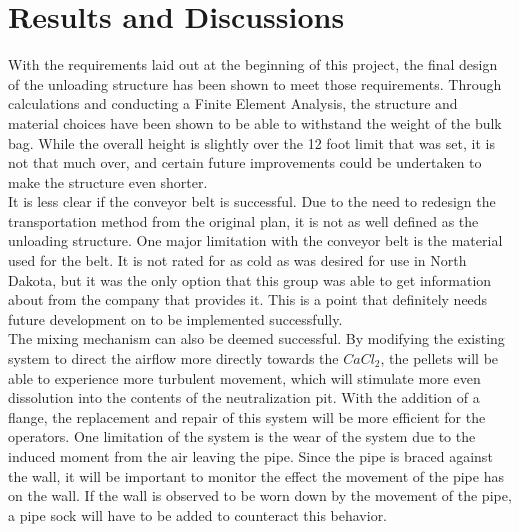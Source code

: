 \documentclass[10pt]{project}
\begin{document}
\section{Results and Discussions}\label{sec:discuss}


With the requirements laid out at the beginning of this project, the final design of the unloading structure has been shown to meet those requirements.  Through calculations and conducting a Finite Element Analysis, the structure and material choices have been shown to be able to withstand the weight of the bulk bag.  While the overall height is slightly over the 12 foot limit that was set, it is not that much over, and certain future improvements could be undertaken to make the structure even shorter.\\
It is less clear if the conveyor belt is successful.  Due to the need to redesign the transportation method from the original plan, it is not as well defined as the unloading structure.  One major limitation with the conveyor belt is the material used for the belt.  It is not rated for as cold as was desired for use in North Dakota, but it was the only option that this group was able to get information about from the company that provides it.  This is a point that definitely needs future development on to be implemented successfully.\\
The mixing mechanism can also be deemed successful.  By modifying the existing system to direct the airflow more directly towards the $CaCl_2$, the pellets will be able to experience more turbulent movement, which will stimulate more even dissolution into the contents of the neutralization pit.  With the addition of a flange, the replacement and repair of this system will be more efficient for the operators.  One limitation of the system is the wear of the system due to the induced moment from the air leaving the pipe.  Since the pipe is braced against the wall, it will be important to monitor the effect the movement of the pipe has on the wall.  If the wall is observed to be worn down by the movement of the pipe, a pipe sock will have to be added to counteract this behavior.\\
\end{document}
